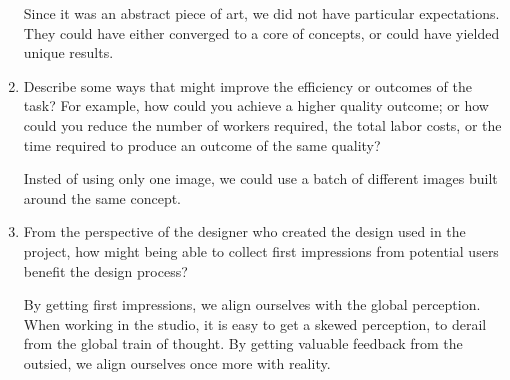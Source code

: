 \documentclass{article}
\begin{document}
\begin{enumerate}
Since it was an abstract piece of art, we did not have particular expectations. They could have either converged to a core of concepts, or could have yielded unique results.

\item Describe some ways that might improve the efficiency or outcomes of the task? For example, how could you achieve a higher quality outcome; or how could you reduce the number of workers required, the total labor costs, or the time required to produce an outcome of the same quality?

Insted of using only one image, we could use a batch of different images built around the same concept.

\item From the perspective of the designer who created the design used in the project, how might being able to collect first impressions from potential users benefit the design process?

By getting first impressions, we align ourselves with the global perception. When working in the studio, it is easy to get a skewed perception, to derail from the global train of thought. By getting valuable feedback from the outsied, we align ourselves once more with reality.

\end{enumerate}
\end{document}
